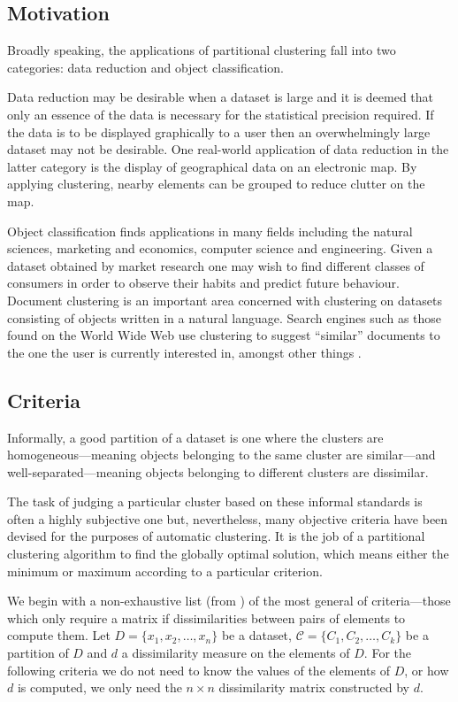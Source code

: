 \documentclass[a4paper]{report}
\newcommand{\dset}{D}
\newcommand{\clus}{\mathcal{C}}
\begin{document}
\subsection{Motivation}
\label{sec:part-clus-motivation}

Broadly speaking, the applications of partitional clustering fall into two
categories: data reduction and object classification.

Data reduction may be desirable when a dataset is large and it is deemed that
only an essence of the data is necessary for the statistical precision
required.  If the data is to be displayed graphically to a user then an
overwhelmingly large dataset may not be desirable.  One real-world application
of data reduction in the latter category is the display of geographical data
on an electronic map.  By applying clustering, nearby elements can be grouped
to reduce clutter on the map.

Object classification finds applications in many fields including the natural
sciences, marketing and economics, computer science and engineering.  Given a
dataset obtained by market research one may wish to find different classes of
consumers in order to observe their habits and predict future behaviour.
Document clustering is an important area concerned with clustering on datasets
consisting of objects written in a natural language.  Search engines such as
those found on the World Wide Web use clustering to suggest ``similar''
documents to the one the user is currently interested in, amongst other things
\citep{steinbach2000comparison}.

\subsection{Criteria}
\label{sec:criteria}

Informally, a good partition of a dataset is one where the clusters are
homogeneous---meaning objects belonging to the same cluster are similar---and
well-separated---meaning objects belonging to different clusters are
dissimilar.

The task of judging a particular cluster based on these informal standards is
often a highly subjective one but, nevertheless, many objective criteria have
been devised for the purposes of automatic clustering.  It is the job of a
partitional clustering algorithm to find the globally optimal solution, which
means either the minimum or maximum according to a particular criterion.

We begin with a non-exhaustive list (from \citep{hansen1997mathprog}) of the
most general of criteria---those which only require a matrix if
dissimilarities between pairs of elements to compute them.  Let $\dset =
\{x_1,x_2,\dotsc,x_n\}$ be a dataset, $\clus = \{C_1,C_2,\dotsc,C_k\}$ be a
partition of $\dset$ and $d$ a dissimilarity measure on the elements of
$\dset$.  For the following criteria we do not need to know the values of the
elements of $\dset$, or how $d$ is computed, we only need the $n \times n$
dissimilarity matrix constructed by $d$.
\end{document}
